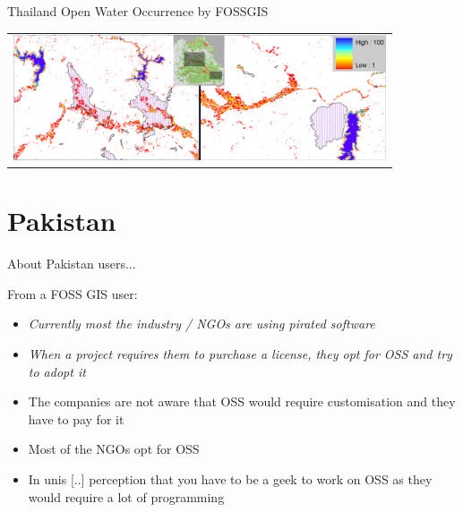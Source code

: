 \documentclass[xcolor=dvipsnames,beamer]{beamer} %
\begin{document}
\begin{frame}[fragile]{Thailand Open Water Occurrence by FOSSGIS}

\begin{flushleft}
\begin{tabular}{l}
\includegraphics[width=11cm]{NETH_ASO_FREQ_irrig_area_insert_big_legend}\\
\end{tabular}
\end{flushleft}

\end{frame}


\section{Pakistan}
\begin{frame}[fragile]{About Pakistan users...}

From a FOSS GIS user:
\begin{itemize}
 \item {\it Currently most the industry / NGOs are using pirated software}
 \item {\it When a project requires them to purchase a license, they opt for OSS and try to adopt it}
\end{itemize}

 \begin{itemize}
  \item The companies are not aware that OSS would require customisation and they have to pay for it
  \item Most of the NGOs opt for OSS
  \item In unis [..] perception that you have to be a geek to work on OSS as they would require a lot of programming
 \end{itemize}

\end{frame}
\end{document}

